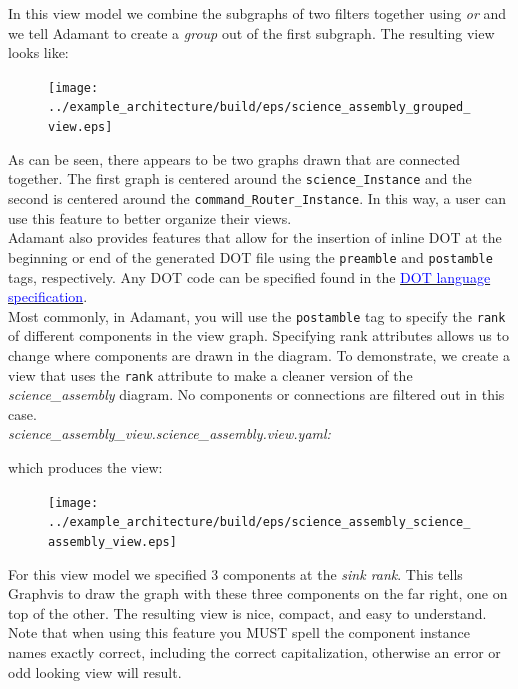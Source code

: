 In this view model we combine the subgraphs of two filters together using \textit{or} and we tell Adamant to create a \textit{group} out of the first subgraph. The resulting view looks like:

\begin{figure}[H]
  \texttt{[image: ../example\_architecture/build/eps/science\_assembly\_grouped\_view.eps]}
\end{figure}

As can be seen, there appears to be two graphs drawn that are connected together. The first graph is centered around the \texttt{science\_Instance} and the second is centered around the \texttt{command\_Router\_Instance}. In this way, a user can use this feature to better organize their views. \\

Adamant also provides features that allow for the insertion of inline DOT at the beginning or end of the generated DOT file using the \texttt{preamble} and \texttt{postamble} tags, respectively. Any DOT code can be specified found in the \href{https://graphviz.gitlab.io/_pages/doc/info/lang.html}{\textcolor{blue}{DOT language specification}}. \\

Most commonly, in Adamant, you will use the \texttt{postamble} tag to specify the \texttt{rank} of different components in the view graph. Specifying rank attributes allows us to change where components are drawn in the diagram. To demonstrate, we create a view that uses the \texttt{rank} attribute to make a cleaner version of the \textit{science\_assembly} diagram. No components or connections are filtered out in this case. \\

\textit{science\_assembly\_view.science\_assembly.view.yaml:}

which produces the view:

\begin{figure}[H]
  \texttt{[image: ../example\_architecture/build/eps/science\_assembly\_science\_assembly\_view.eps]}
\end{figure}

For this view model we specified 3 components at the \textit{sink rank}. This tells Graphvis to draw the graph with these three components on the far right, one on top of the other. The resulting view is nice, compact, and easy to understand. Note that when using this feature you MUST spell the component instance names exactly correct, including the correct capitalization, otherwise an error or odd looking view will result. \\

